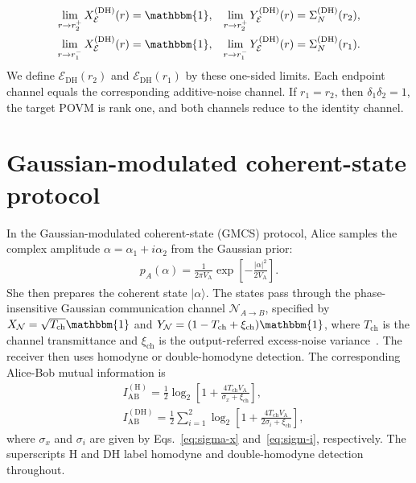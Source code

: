 \documentclass[%
final, 
superscriptaddress,
 amsmath,amssymb,amsfonts,
 aps,
 pra,
 longbibliography,
]{revtex4-2}
\newcommand{\ket}[1]{\ensuremath{|{#1}\rangle}}
\newcommand{\ind}[1]{\mathrm{#1}}
\begin{document}
\begin{align}
  \lim_{r\to r_2^+}X_{\mathcal{E}}^{(\ind{DH})}(r)&=\mathbbm{1},
  &
  \lim_{r\to r_2^+}Y_{\mathcal{E}}^{(\ind{DH})}(r)&=\Sigma_N^{(\ind{DH})}(r_2),\\
  \lim_{r\to r_1^-}X_{\mathcal{E}}^{(\ind{DH})}(r)&=\mathbbm{1},
  &
  \lim_{r\to r_1^-}Y_{\mathcal{E}}^{(\ind{DH})}(r)&=\Sigma_N^{(\ind{DH})}(r_1).
\end{align}
We define $\mathcal{E}_{\ind{DH}}(r_2)$ and $\mathcal{E}_{\ind{DH}}(r_1)$ by these one-sided limits. Each endpoint channel equals the corresponding additive-noise channel. If $r_1=r_2$, then $\delta_1\delta_2=1$, the target POVM is rank one, and both channels reduce to the identity channel.

\section{Gaussian-modulated coherent-state protocol}\label{sec:protocol}
In the Gaussian-modulated coherent-state (GMCS) protocol, Alice samples the complex amplitude $\alpha=\alpha_1+i\alpha_2$ from the Gaussian prior:
\begin{align}
  p_A(\alpha)
  =\frac{1}{2\pi V_{\ind{A}}}\exp\!\left[-\frac{|\alpha|^2}{2V_{\ind{A}}}\right].
\end{align}
She then prepares the coherent state $\ket{\alpha}$.
The states pass through the phase-insensitive Gaussian communication channel $\mathcal{N}_{A\to B}$, specified by $X_{\mathcal{N}}=\sqrt{T_{\ind{ch}}}\mathbbm{1}$ and $Y_{\mathcal{N}}=(1-T_{\ind{ch}}+\xi_{\ind{ch}})\mathbbm{1}$, where $T_{\ind{ch}}$ is the channel transmittance and $\xi_{\ind{ch}}$ is the output-referred excess-noise variance~\cite{Laudenbach:aqt:2018}.
The receiver then uses homodyne or double-homodyne detection. The corresponding Alice-Bob mutual information is~\cite{naumchik2025asymmetryeffectshomodyneheterodyne}
\begin{align}
  \label{eq:I_H_res}
  &I_{\ind{AB}}^{(\ind{H})}=\frac{1}{2}\log_2\left[1+\frac{4T_{\ind{ch}}V_{\ind{A}}}{\sigma_x+\xi_{\ind{ch}}}\right],\\
  \label{eq:I_DH_res}
  &I_{\ind{AB}}^{(\ind{DH})}=\frac{1}{2}\sum_{i=1}^{2}\log_2\left[1+\frac{4T_{\ind{ch}}V_{\ind{A}}}
    {2 \sigma_i+\xi_{\ind{ch}}}\right],
\end{align}
where $\sigma_x$ and $\sigma_i$ are given by Eqs.~\eqref{eq:sigma-x} and~\eqref{eq:sigm-i}, respectively. The superscripts $\ind{H}$ and $\ind{DH}$ label homodyne and double-homodyne detection throughout.
\end{document}

